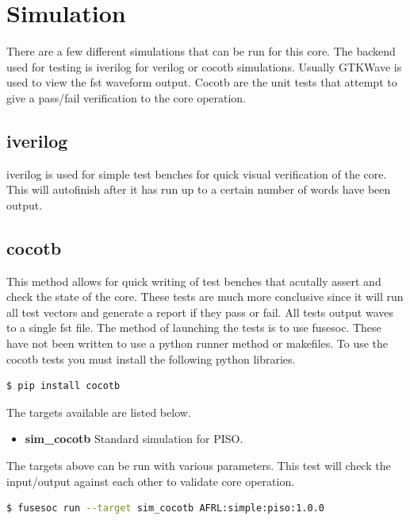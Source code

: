 \newpage

\section{Simulation}
\par
There are a few different simulations that can be run for this core. The backend used for testing is iverilog for verilog or cocotb simulations. Usually GTKWave is used to view the fst waveform output. Cocotb are the unit tests that attempt to give a pass/fail verification to the core operation.

\subsection{iverilog}
\par
iverilog is used for simple test benches for quick visual verification of the core. This will autofinish after it has
run up to a certain number of words have been output.

\subsection{cocotb}
\par
This method allows for quick writing of test benches that acutally assert and check the state of the core.
These tests are much more conclusive since it will run all test vectors and generate a report if they
pass or fail. All tests output waves to a single fst file. The method of launching the tests is to use
fusesoc. These have not been written to use a python runner method or makefiles.
To use the cocotb tests you must install the following python libraries.
\begin{lstlisting}[language=bash]
  $ pip install cocotb
\end{lstlisting}

The targets available are listed below.
\begin{itemize}
  \item \textbf{sim\_cocotb} Standard simulation for PISO.
\end{itemize}

The targets above can be run with various parameters.
This test will check the input/output against each other to validate core operation.
\begin{lstlisting}[language=bash]
  $ fusesoc run --target sim_cocotb AFRL:simple:piso:1.0.0
\end{lstlisting}

